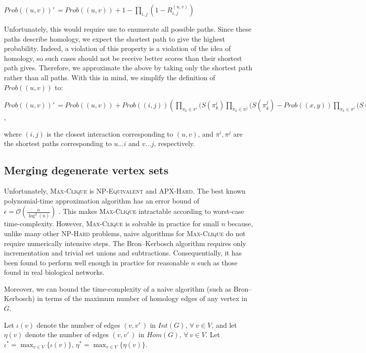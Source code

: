 \documentclass[12pt,twoside]{article}
\def\NI{\noindent}
\begin{document}
\NI $Prob((u,v))'\,\! = Prob((u,v)) + 1 - \displaystyle \prod_{i,j}(1 - R_{i,j}^{(u,v)})$

\NI Unfortunately, this would require use to enumerate all possible paths. Since these paths describe homology, we expect the shortest path to give the highest probability. Indeed, a violation of this property is a violation of the idea of homology, so such cases should not be receive better scores than their shortest path gives. Therefore, we approximate the above by taking only the shortest path rather than all paths. With this in mind, we simplify the definition of $Prob((u,v))$ to:

\NI $Prob((u,v))'\,\! = Prob((u,v)) + \displaystyle Prob((i,j)) \left( \prod_{\pi_k \in \pi^i}(S(\pi_k^i) \prod_{\pi_k \in \pi^j}(S(\pi_k^j) - Prob((x,y)) \prod_{\pi_k \in \pi^i}(S(\pi_k^i) \prod_{\pi_k \in \pi^j}(S(\pi_k^j) \right)$,

\NI where $(i,j)$ is the closest interaction corresponding to $(u,v)$, and $\pi^i, \pi^j$ are the shortest paths corresponding to $u \ldots i$ and $v \ldots j$, respectively.

\subsection{Merging degenerate vertex sets}

\NI Unfortunately, \textsc{Max-Clique} is \textsc{NP-Equivalent} and \textsc{APX-Hard}. The best known polynomial-time approximation algorithm has an error bound of $\epsilon = \mathcal O \left(\frac{n}{\log^2(n)}\right)$ \cite{boppana}. This makes \textsc{Max-Clique} intractable according to worst-case time-complexity. However, \textsc{Max-Clique} is solvable in practice for small $n$ because, unlike many other \textsc{NP-Hard} problems, naive algorithms for \textsc{Max-Clique} do not require numerically intensive steps. The Bron--Kerbosch algorithm requires only incrementation and trivial set unions and subtractions. Consequentially, it has been found to perform well enough in practice for reasonable $n$ such as those found in real biological networks.

\NI Moreover, we can bound the time-complexity of a naive algorithm (such as Bron--Kerbosch) in terms of the maximum number of homology edges of any vertex in $G$.

\NI Let $\iota(v)$ denote the number of edges $(v, v'\,\!)$ in $Int(G)$, $\forall \: v \in V$, and let $\eta(v)$ denote the number of edges $(v, v'\,\!)$ in $Hom(G)$, $\forall \: v \in V$. Let $\iota^* = \displaystyle \max_{v \in V}\{\iota(v)\}$, $\eta^* = \displaystyle \max_{v \in V}\{\eta(v)\}$.
\end{document}
